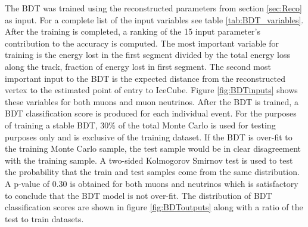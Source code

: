 \documentclass{PoS}
\begin{document}
The BDT was trained using the reconstructed parameters from section \ref{sec:Reco} as input. For a complete list of the input variables see table \ref{tab:BDT_variables}. After the training is completed, a ranking of the 15 input parameter's contribution to the accuracy is computed. The most important variable for training is the energy lost in the first segment divided by the total energy loss along the track, fraction of energy lost in first segment. The second most important input to the BDT is the expected distance from the reconstructed vertex to the estimated point of entry to IceCube. Figure \ref{fig:BDTinputs} shows these variables for both muons and muon neutrinos. After the BDT is trained, a BDT classification score is produced for each individual event. For the purposes of training a stable BDT, 30\% of the total Monte Carlo is used for testing purposes only and is exclusive of the training dataset. If the BDT is over-fit to the training Monte Carlo sample, the test sample would be in clear disagreement with the training sample. A two-sided Kolmogorov Smirnov test is used to test the probability that the train and test samples come from the same distribution. A p-value of 0.30 is obtained for both muons and neutrinos which is satisfactory to conclude that the BDT model is not over-fit. The distribution of BDT classification scores are shown in figure \ref{fig:BDToutputs} along with a ratio of the test to train datasets.
\end{document}

